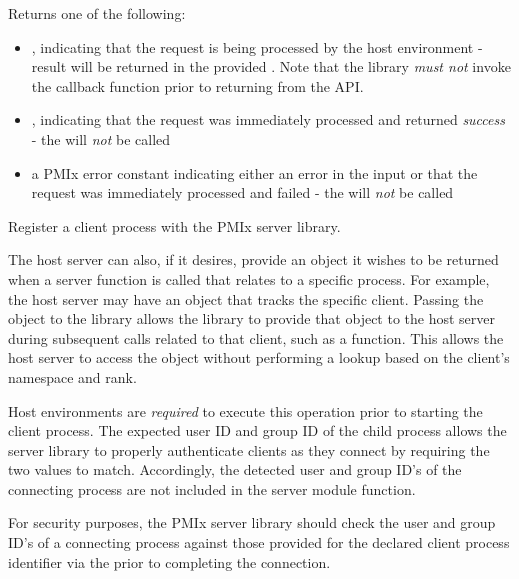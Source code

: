 Returns one of the following:

\begin{itemize}
    \item {}, indicating that the request is being processed by the host environment - result will be returned in the provided . Note that the library \emph{must not} invoke the callback function prior to returning from the \ac{API}.
    \item {}, indicating that the request was immediately processed and returned \textit{success} - the  will \textit{not} be called
    \item a PMIx error constant indicating either an error in the input or that the request was immediately processed and failed - the  will \textit{not} be called
\end{itemize}


\descr

Register a client process with the PMIx server library.

The host server can also, if it desires, provide an object it wishes to be returned when a server function is called that relates to a specific process.
For example, the host server may have an object that tracks the specific client.
Passing the object to the library allows the library to provide that object to the host server during subsequent calls related to that client, such as a  function.  This allows the host server to access the object without performing a lookup based on the client's namespace and rank.

\advicermstart
Host environments are \textit{required} to execute this operation prior to starting the client process.
The expected user ID and group ID of the child process allows the server library to properly authenticate clients as they connect by requiring the two values to match. Accordingly, the detected user and group ID's of the connecting process are not included in the  server module function.
\advicermend

\adviceimplstart
For security purposes, the \ac{PMIx} server library should check the user and group ID's of a connecting process against those provided for the declared client process identifier via the  prior to completing the connection.
\adviceimplend

\subsection{}


